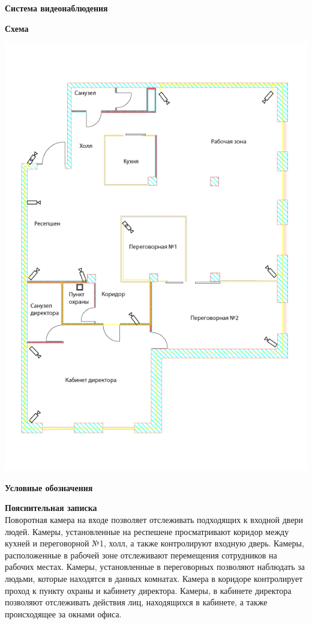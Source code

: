 \documentclass[a4paper,14pt]{extarticle}
\begin{document}
    \newpage
    \textbf{\large{Система видеонаблюдения}}

    \begin{center}
        \textbf{Схема}
    \end{center}
    \vspace{-6ex}
    \begin{center}
        \includegraphics[scale=0.65, angle=90]{pics/Cams.png}
    \end{center}
    \textbf{Условные обозначения}
    \begin{center}
        
    \end{center}
    \textbf{Пояснительная записка}\\
    Поворотная камера на входе позволяет отслеживать подходящих к входной двери людей.
    Камеры, установленные на респешене просматривают коридор между кухней и переговорной №1, холл, а также контролируют входную дверь.
    Камеры, расположенные в рабочей зоне отслеживают перемещения сотрудников на рабочих местах. 
    Камеры, установленные в переговорных позволяют наблюдать за людьми, которые находятся в данных комнатах.
    Камера в коридоре контролирует проход к пункту охраны и кабинету директора.
    Камеры, в кабинете директора позволяют отслеживать действия лиц, находящихся в кабинете, а также происходящее за окнами офиса. 
\end{document}
